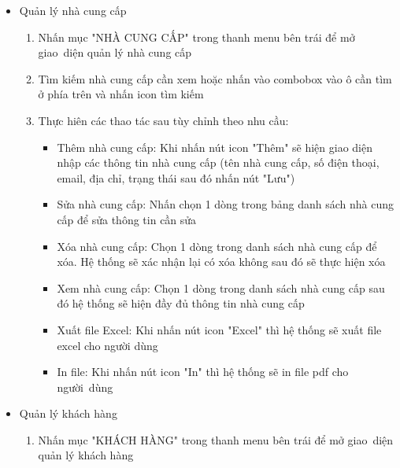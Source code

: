 \documentclass[a4paper,12pt]{report}
\begin{document}
\begin{itemize}
\begin{itemize}
\begin{enumerate}[label=B\arabic*:]
                        \item Quan sát bảng danh sách phiên bản sản phẩm (phía dưới) để xem các biến thể như màu sắc, RAM, ROM, giá bán, số lượng tương ứng với sản phẩm đang được chọn
                    \end{enumerate}
              \item Quản lý nhà cung cấp
                    \begin{enumerate}[label=B\arabic*:]
                        \item Nhấn mục "NHÀ CUNG CẤP" trong thanh menu bên trái để mở giao~diện quản lý nhà cung cấp
                        \item Tìm kiếm nhà cung cấp cần xem hoặc nhấn vào combobox vào ô cần tìm ở phía trên và nhấn icon tìm kiếm
                        \item Thực hiên các thao tác sau tùy chỉnh theo nhu cầu:
                              \begin{itemize}
                                  \item Thêm nhà cung cấp: Khi nhấn nút icon "Thêm" sẽ hiện giao diện nhập các thông tin nhà cung cấp (tên nhà cung cấp, số điện thoại, email, địa chỉ, trạng thái sau đó nhấn nút "Lưu")
                                  \item Sửa nhà cung cấp: Nhấn chọn 1 dòng trong bảng danh sách nhà cung cấp để sửa thông tin cần sửa
                                  \item Xóa nhà cung cấp: Chọn 1 dòng trong danh sách nhà cung cấp để xóa. Hệ thống sẽ xác nhận lại có xóa không sau đó sẽ thực hiện xóa
                                  \item Xem nhà cung cấp: Chọn 1 dòng trong danh sách nhà cung cấp sau đó hệ thống sẽ hiện đầy đủ thông tin nhà cung cấp
                                  \item Xuất file Excel: Khi nhấn nút icon "Excel" thì hệ thống sẽ xuất file excel cho người dùng
                                  \item In file: Khi nhấn nút icon "In" thì hệ thống sẽ in file pdf cho người~dùng
                              \end{itemize}
                    \end{enumerate}
              \item Quản lý khách hàng
                    \begin{enumerate}[label=B\arabic*:]
                        \item Nhấn mục "KHÁCH HÀNG" trong thanh menu bên trái để mở giao~diện quản lý khách hàng

\end{enumerate}
\end{itemize}
\end{itemize}
\end{document}
